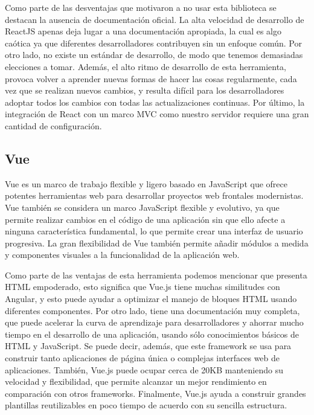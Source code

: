 Como parte de las desventajas que motivaron a no usar esta biblioteca se destacan la ausencia de documentaci\'on oficial. La alta velocidad de desarrollo de ReactJS apenas deja lugar a una documentaci\'on apropiada, la cual es algo ca\'otica ya que diferentes desarrolladores contribuyen sin un enfoque com\'un. Por otro lado, no existe un est\'andar de desarrollo, de modo que tenemos demasiadas elecciones a tomar. Adem\'as, el alto ritmo de desarrollo de esta herramienta, provoca volver a aprender nuevas formas de hacer las cosas regularmente, cada vez que se realizan nuevos cambios, y resulta dif\'icil para los desarrolladores adoptar todos los cambios con todas las actualizaciones continuas. Por \'ultimo, la integraci\'on de React con un marco MVC como nuestro servidor requiere una gran cantidad de configuraci\'on.


\subsection{Vue}
Vue es un marco de trabajo flexible y ligero basado en JavaScript que ofrece potentes herramientas web para desarrollar proyectos web frontales modernistas. Vue tambi\'en se considera un marco JavaScript flexible y evolutivo, ya que permite realizar cambios en el c\'odigo de una aplicaci\'on sin que ello afecte a ninguna caracter\'istica fundamental, lo que permite crear una interfaz de usuario progresiva. La gran flexibilidad de Vue tambi\'en permite a\~nadir m\'odulos a medida y componentes visuales a la funcionalidad de la aplicaci\'on web.

Como parte de las ventajas de esta herramienta podemos mencionar que presenta HTML empoderado, esto significa que Vue.js tiene muchas similitudes con Angular, y esto puede ayudar a optimizar el manejo de bloques HTML usando diferentes componentes. Por otro lado, tiene una documentaci\'on muy completa, que puede acelerar la curva de aprendizaje para desarrolladores y ahorrar mucho tiempo en el desarrollo de una aplicaci\'on, usando s\'olo conocimientos b\'asicos de HTML y JavaScript. Se puede decir, adem\'as, que este framework se usa para construir tanto aplicaciones de p\'agina \'unica o complejas interfaces web de aplicaciones. Tambi\'en, Vue.js puede ocupar cerca de 20KB manteniendo su velocidad y flexibilidad, que permite alcanzar un mejor rendimiento en comparaci\'on con otros frameworks. Finalmente, Vue.js ayuda a construir grandes plantillas reutilizables en poco tiempo de acuerdo con su sencilla estructura.

